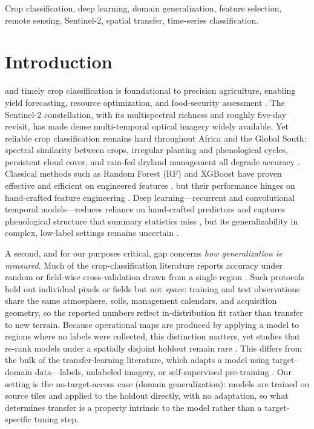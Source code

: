 \documentclass[journal]{IEEEtran}
\begin{document}
\begin{IEEEkeywords}
Crop classification, deep learning, domain generalization, feature selection, remote sensing, Sentinel-2, spatial transfer, time-series classification.
\end{IEEEkeywords}

\section{Introduction}
 and timely crop classification is foundational to precision agriculture, enabling yield forecasting, resource optimization, and food-security assessment \cite{begue2020, ieee2017}. The Sentinel-2 constellation, with its multispectral richness and roughly five-day revisit, has made dense multi-temporal optical imagery widely available. Yet reliable crop classification remains hard throughout Africa and the Global South: spectral similarity between crops, irregular planting and phenological cycles, persistent cloud cover, and rain-fed dryland management all degrade accuracy \cite{begue2020, mahlayeye2024}. Classical methods such as Random Forest (RF) and XGBoost have proven effective and efficient on engineered features \cite{mahlayeye2024, mann2023, mann2017, mann2019}, but their performance hinges on hand-crafted feature engineering \cite{maxwell2019, belgiu2016}. Deep learning---recurrent and convolutional temporal models---reduces reliance on hand-crafted predictors and captures phenological structure that summary statistics miss \cite{zhu2017, russwurm2018, tempcnn2019}, but its generalizability in complex, low-label settings remains uncertain \cite{pankajakshan2025}.

A second, and for our purposes critical, gap concerns \emph{how generalization is measured}. Much of the crop-classification literature reports accuracy under random or field-wise cross-validation drawn from a single region \cite{belgiu2016, ltae2020, tempcnn2019, russwurm2018, ieee2017}. Such protocols hold out individual pixels or fields but not \emph{space}: training and test observations share the same atmosphere, soils, management calendars, and acquisition geometry, so the reported numbers reflect in-distribution fit rather than transfer to new terrain. Because operational maps are produced by applying a model to regions where no labels were collected, this distinction matters, yet studies that re-rank models under a spatially disjoint holdout remain rare \cite{pankajakshan2025, jin2019, rustowicz2019}. This differs from the bulk of the transfer-learning literature, which adapts a model using target-domain data---labels, unlabeled imagery, or self-supervised pre-training \cite{ma2024, cropformer2023, mai2025}. Our setting is the no-target-access case (domain generalization): models are trained on source tiles and applied to the holdout directly, with no adaptation, so what determines transfer is a property intrinsic to the model rather than a target-specific tuning step.
\end{document}

